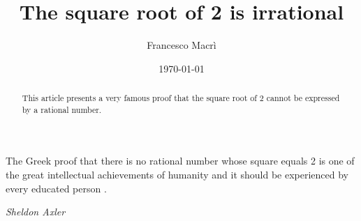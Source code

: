 \documentclass[11pt]{amsart}
\theoremstyle{definition}
\begin{document}
\epigraph{The Greek proof that there is no rational number whose square equals 2 is one of the great intellectual achievements of humanity and it should be experienced by every educated person \cite[4]{axlerAlgebraTrigonometryStudent2012}.} {\textit{Sheldon Axler}}
\title{The square root of 2 is irrational}
\author{Francesco Macrì }
\date{\today}
\begin{abstract}
    This article presents a very famous proof that the square root of 2 cannot be expressed by a rational number.
\end{abstract}
\maketitle
\noindent{}
\end{document}
